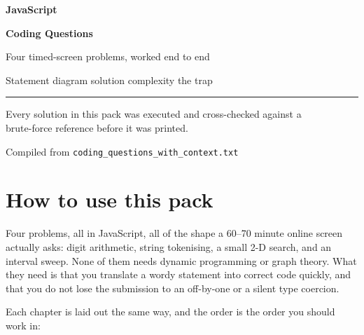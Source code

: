 \documentclass[11pt,a4paper]{article}
\begin{document}
\begin{titlepage}
\centering
\vspace*{3.2cm}
{\Huge\bfseries JavaScript\par}
\vspace{0.4cm}
{\Huge\bfseries Coding Questions\par}
\vspace{1.1cm}
{\large\color{muted} Four timed-screen problems, worked end to end\par}
\vspace{0.3cm}
{\large\color{muted} Statement \textperiodcentered{} diagram \textperiodcentered{} solution
\textperiodcentered{} complexity \textperiodcentered{} the trap\par}
\vspace{2.4cm}
\rule{8cm}{1pt}\par
\vspace{2.4cm}
{\color{muted}
Every solution in this pack was executed and cross-checked against a\\[2pt]
brute-force reference before it was printed.\par}
\vfill
{\small\color{muted} Compiled from \texttt{coding\_questions\_with\_context.txt}\par}
\end{titlepage}
\setcounter{page}{2}

\tableofcontents

\clearpage
\section{How to use this pack}

Four problems, all in JavaScript, all of the shape a 60--70 minute online screen
actually asks: digit arithmetic, string tokenising, a small 2-D search, and an
interval sweep. None of them needs dynamic programming or graph theory. What
they need is that you translate a wordy statement into correct code quickly, and
that you do not lose the submission to an off-by-one or a silent type coercion.

Each chapter is laid out the same way, and the order is the order you should
work in:
\end{document}
